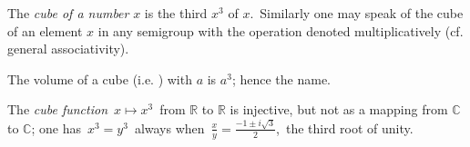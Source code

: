 \documentclass[12pt]{article}
\begin{document}
The {\em cube of a number} $x$ is the third  $x^3$ of $x$.\, Similarly one may speak of the cube of an element $x$ in any semigroup with the operation denoted multiplicatively (cf. general associativity).

The volume of a cube (i.e.  ) with  $a$ is $a^3$; hence the name.

The {\em cube function}\, $x\mapsto x^3$\, from $\mathbb{R}$ to $\mathbb{R}$ is injective, but not as a mapping from $\mathbb{C}$ to $\mathbb{C}$; one has\, $x^3 = y^3$\, always when\, $\frac{x}{y} = \frac{-1\pm i\sqrt{3}}{2}$,\, the  third root of unity.
\end{document}
